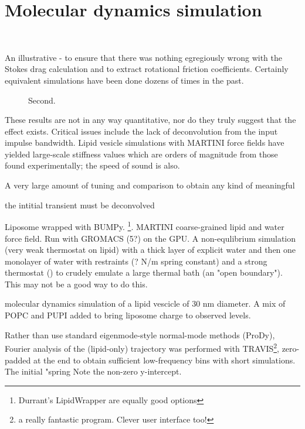 \documentclass[paper.tex]{subfiles}
\begin{document}
\section{Molecular dynamics simulation}
\


An illustrative - to ensure that there was nothing egregiously wrong with the Stokes drag calculation and to extract rotational friction coefficients. Certainly equivalent simulations have been done dozens of times in the past.

\begin{figure}[H]
	\centering
	\hfill
		\caption{Second.}
		
\end{figure}

These results are not in any way quantitative, nor do they truly suggest that the effect exists. Critical issues include the lack of deconvolution from the input impulse bandwidth. Lipid vesicle simulations with MARTINI force fields have yielded large-scale stiffness values which are orders of magnitude\cite{Determining2014} from those found experimentally; the speed of sound is also. 

A very large amount of tuning and comparison  to obtain any kind of meaningful  

the intitial transient must be deconvolved

Liposome wrapped with BUMPy\cite{BUMPy2018}. \footnote{Durrant's LipidWrapper are equally good options}. MARTINI 
coarse-grained 
lipid and water force field. Run with GROMACS (5?) on the GPU. A non-equlibrium simulation (very weak thermostat on lipid) with a thick layer of explicit water and then one monolayer of water with restraints (? N/m spring constant) and a strong thermostat () to crudely emulate a large thermal bath (an "open boundary"). This may not be a good way to do this.

molecular dynamics simulation of a lipid vescicle of 30 nm diameter. A mix of POPC and PUPI added to bring liposome charge to 
observed levels.

Rather than use standard eigenmode-style normal-mode methods (ProDy), Fourier analysis of the (lipid-only) trajectory was performed with TRAVIS\footnote{a really fantastic program. Clever user interface too!}, zero-padded at the end to obtain sufficient low-frequency bins with short simulations. The initial "spring Note the non-zero y-intercept. 
\end{document}
